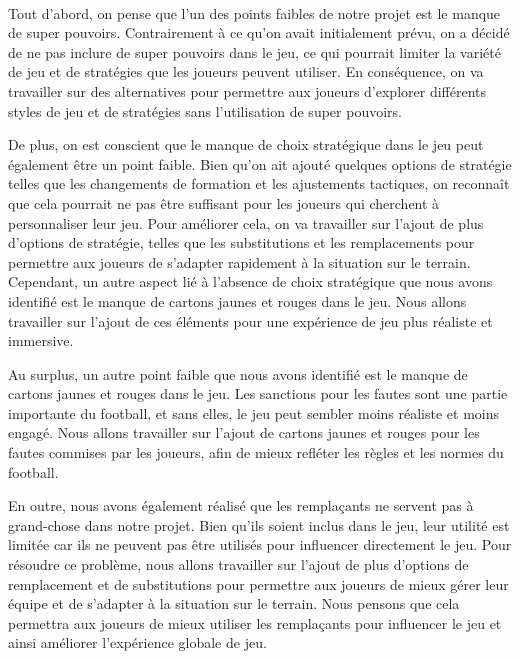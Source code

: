 \paragraph{}
    Tout d'abord, on pense que l'un des points faibles de notre projet est le manque de super pouvoirs. Contrairement à ce qu'on avait initialement prévu, on a décidé de ne pas inclure de super pouvoirs dans le jeu, ce qui pourrait limiter la variété de jeu et de stratégies que les joueurs peuvent utiliser. En conséquence, on va travailler sur des alternatives pour permettre aux joueurs d'explorer différents styles de jeu et de stratégies sans l'utilisation de super pouvoirs.

De plus, on est conscient que le manque de choix stratégique dans le jeu peut également être un point faible. Bien qu'on ait ajouté quelques options de stratégie telles que les changements de formation et les ajustements tactiques, on reconnaît que cela pourrait ne pas être suffisant pour les joueurs qui cherchent à personnaliser leur jeu. Pour améliorer cela, on va travailler sur l'ajout de plus d'options de stratégie, telles que les substitutions et les remplacements pour permettre aux joueurs de s'adapter rapidement à la situation sur le terrain. Cependant, un autre aspect lié à l'absence de choix stratégique que nous avons identifié est le manque de cartons jaunes et rouges dans le jeu. Nous allons travailler sur l'ajout de ces éléments pour une expérience de jeu plus réaliste et immersive.

Au surplus, un autre point faible que nous avons identifié est le manque de cartons jaunes et rouges dans le jeu. Les sanctions pour les fautes sont une partie importante du football, et sans elles, le jeu peut sembler moins réaliste et moins engagé. Nous allons travailler sur l'ajout de cartons jaunes et rouges pour les fautes commises par les joueurs, afin de mieux refléter les règles et les normes du football.

En outre, nous avons également réalisé que les remplaçants ne servent pas à grand-chose dans notre projet. Bien qu'ils soient inclus dans le jeu, leur utilité est limitée car ils ne peuvent pas être utilisés pour influencer directement le jeu. Pour résoudre ce problème, nous allons travailler sur l'ajout de plus d'options de remplacement et de substitutions pour permettre aux joueurs de mieux gérer leur équipe et de s'adapter à la situation sur le terrain. Nous pensons que cela permettra aux joueurs de mieux utiliser les remplaçants pour influencer le jeu et ainsi améliorer l'expérience globale de jeu.

